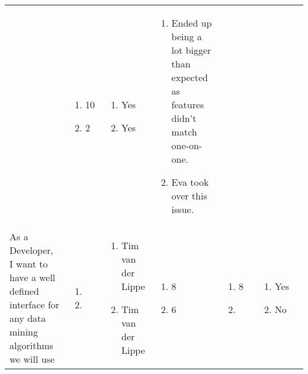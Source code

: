 \documentclass[11pt,a4paper]{article}
\begin{document}
\begin{table}[h]
\begin{tabular}{|p{4cm}|p{0.6cm}|p{2.0cm}|p{1.8cm}|p{1.8cm}|p{1.0cm}|p{5cm}}
& \begin{enumerate}[leftmargin=*,itemindent=0.1cm]
\item[] 10 
\item[] 2 
\end{enumerate}

& \begin{enumerate}[leftmargin=*,itemindent=0.1cm]
\item[] Yes
\item[] Yes
\end{enumerate}

& \begin{enumerate}[leftmargin=*,itemindent=0.1cm]
\item[] Ended up being a lot bigger than expected as features didn't match one-on-one.
\item[] Eva took over this issue.
\end{enumerate}

 \\

As a Developer, I want to have a well defined interface for any data mining algorithms we will use & \begin{enumerate}[leftmargin=*,itemindent=0.1cm]
\item 
\item
\end{enumerate}

& 
\begin{enumerate}[leftmargin=*,itemindent=0.1cm]
\item[] Tim van der Lippe
\item[] Tim van der Lippe
\end{enumerate}

& 
\begin{enumerate}[leftmargin=*,itemindent=0.1cm]
\item[] 8 
\item[] 6 
\end{enumerate}

&
\begin{enumerate}[leftmargin=*,itemindent=0.1cm]
\item[] 8 
\item[]
\end{enumerate}

&
\begin{enumerate}[leftmargin=*,itemindent=0.1cm]
\item[] Yes
\item[] No
\end{enumerate}


\end{tabular}
\end{table}
\end{document}
